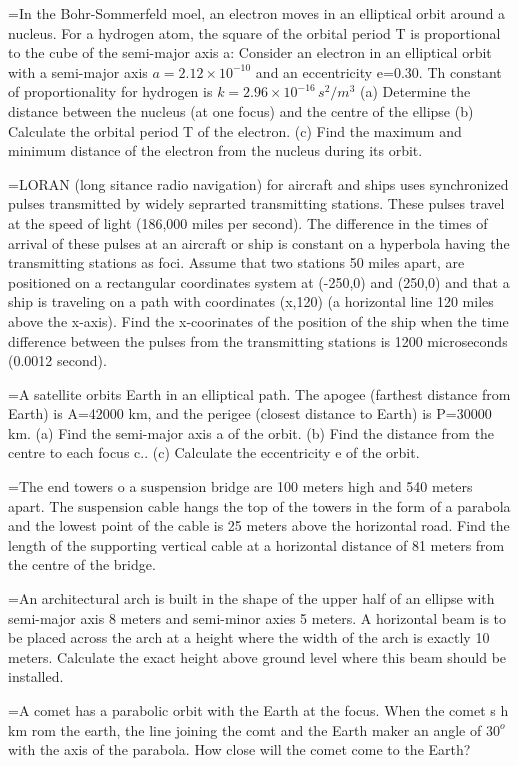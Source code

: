 \documentclass[11pt,a4paper]{article}
\newlength{\qw}\settowidth{\qw}{\textbf{888.}\ }
\newcommand{\q}[2]{%
  \Needspace{3\baselineskip}%
  \par\medskip\noindent\hangindent=\qw\hangafter=1\makebox[\qw][l]{\textbf{#1.}}#2\par}
\begin{document}
\q{444}{In the Bohr-Sommerfeld moel, an electron moves in an elliptical orbit around a nucleus. For a hydrogen atom, the square of the orbital period T is proportional to the cube of the semi-major axis a: Consider an electron in an elliptical orbit with a semi-major axis $a=2.12\times10^{-10}$ and an eccentricity e=0.30. Th constant of proportionality for hydrogen is $k=2.96\times10^{-16}\,s^{2}/m^{3}$ (a) Determine the distance between the nucleus (at one focus) and the centre of the ellipse (b) Calculate the orbital period T of the electron. (c) Find the maximum and minimum distance of the electron from the nucleus during its orbit.}
\q{445}{LORAN (long sitance radio navigation) for aircraft and ships uses synchronized pulses transmitted by widely seprarted transmitting stations. These pulses travel at the speed of light (186,000 miles per second). The difference in the times of arrival of these pulses at an aircraft or ship is constant on a hyperbola having the transmitting stations as foci. Assume that two stations 50 miles apart, are positioned on a rectangular coordinates system at (-250,0) and (250,0) and that a ship is traveling on a path with coordinates (x,120) (a horizontal line 120 miles above the x-axis). Find the x-coorinates of the position of the ship when  the time difference between the pulses from the transmitting stations is 1200 microseconds (0.0012 second).}
\q{446}{A satellite orbits Earth in an elliptical path. The apogee (farthest distance from Earth) is A=42000 km, and the perigee (closest distance to Earth) is P=30000 km. (a) Find the semi-major axis a of the orbit.  (b) Find the distance from the centre to each focus c..  (c) Calculate the eccentricity e of the orbit.}
\q{447}{The end towers o a suspension bridge are 100 meters high and 540 meters apart. The suspension cable hangs the top of the towers in the form of a parabola and the lowest point of the cable is 25 meters above the horizontal road. Find the length of the supporting vertical cable at a horizontal distance of 81 meters from the centre of the bridge.}
\q{448}{An architectural arch is built in the shape of the upper half of an ellipse with semi-major axis 8 meters and semi-minor axies 5 meters. A horizontal beam is to be placed across the arch at a height where the width of the arch is exactly 10 meters. Calculate the exact height above ground level where this beam should be installed.}
\q{449}{A comet has a parabolic orbit with the Earth at the focus. When the comet s h km rom the earth, the line joining the comt and the Earth maker an angle of $30^{o}$ with the axis of the parabola. How close will the comet come to the Earth?}
\end{document}

